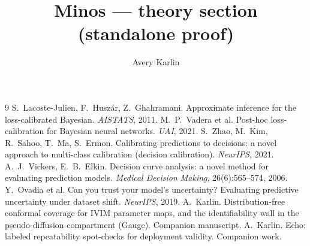 \documentclass[11pt]{article}
\title{\textbf{Minos --- theory section (standalone proof)}}
\author{Avery Karlin}
\date{}
\begin{document}
\maketitle



\begin{thebibliography}{9}
 S.~Lacoste-Julien, F.~Husz\'ar, Z.~Ghahramani.
  Approximate inference for the loss-calibrated Bayesian. \emph{AISTATS}, 2011.
 M.~P.~Vadera et al. Post-hoc loss-calibration for Bayesian neural networks.
  \emph{UAI}, 2021.
 S.~Zhao, M.~Kim, R.~Sahoo, T.~Ma, S.~Ermon. Calibrating predictions to decisions:
  a novel approach to multi-class calibration (decision calibration). \emph{NeurIPS}, 2021.
 A.~J.~Vickers, E.~B.~Elkin. Decision curve analysis: a novel method for
  evaluating prediction models. \emph{Medical Decision Making}, 26(6):565--574, 2006.
 Y.~Ovadia et al. Can you trust your model's uncertainty? Evaluating predictive
  uncertainty under dataset shift. \emph{NeurIPS}, 2019.
 A.~Karlin. Distribution-free conformal coverage for IVIM parameter maps, and the
  identifiability wall in the pseudo-diffusion compartment (Gauge). Companion manuscript.
 A.~Karlin. Echo: labeled repeatability spot-checks for deployment validity.
  Companion work.
\end{thebibliography}
\end{document}
